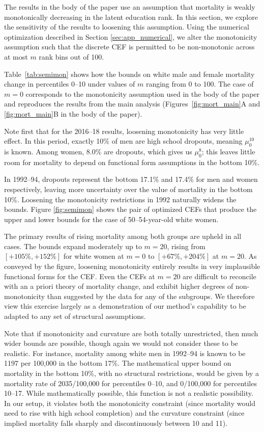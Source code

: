 The results in the body of the paper use an assumption that mortality is weakly monotonically decreasing in the latent education rank. In this section, we explore the sensitivity of the results to loosening this assumption. Using the numerical optimization described in Section \ref{sec:app_numerical}, we alter the monotonicity assumption such that the discrete CEF is permitted to be non-monotonic across at most $m$ rank bins out of 100.

Table~\ref{tab:semimon} shows how the bounds on white male and female mortality change in percentiles 0--10 under values of $m$ ranging from 0 to 100. The case of $m=0$ corresponds to the monotonicity assumption used in the body of the paper and reproduces the results from the main analysis (Figures~\ref{fig:mort_main}A and \ref{fig:mort_main}B in the body of the paper).

Note first that for the 2016--18 results, loosening monotonicity has very little effect. In this period, exactly 10\% of men are high school dropouts, meaning $\mu_0^{10}$ is known. Among women, 8.0\% are dropouts, which gives us $\mu_0^8$; this leaves little room for mortality to depend on functional form assumptions in the bottom 10\%.

In 1992--94, dropouts represent the bottom 17.1\% and 17.4\% for men and women respectively, leaving more uncertainty over the value of mortality in the bottom 10\%. Loosening the monotonicity restrictions in 1992 naturally widens the bounds. Figure \ref{fig:semimon} shows the pair of optimized CEFs that produce the upper and lower bounds for the case of 50--54-year-old white women.

The primary results of rising mortality among both groups are upheld in all cases. The bounds expand moderately up to $m=20$, rising from $[+105\%, +152\%]$ for white women at $m=0$ to $[+67\%, +204\%]$ at $m=20$. As conveyed by the figure, loosening monotonicity entirely results in very implausible functional forms for the CEF. Even the CEFs at $m=20$ are difficult to reconcile with an a priori theory of mortality change, and exhibit higher degrees of non-monotonicity than suggested by the data for any of the subgroups. We therefore view this exercise largely as a demonstration of our method's capability to be adapted to any set of structural assumptions.

Note that if monotonicity and curvature are both totally unrestricted, then much wider bounds are possible, though again we would not consider these to be realistic. For instance, mortality among white men in 1992--94 is known to be 1197 per 100,000 in the bottom 17\%. The mathematical upper bound on mortality in the bottom 10\%, with no structural restrictions, would be given by a mortality rate of 2035/100,000 for percentiles 0--10, and 0/100,000 for percentiles 10--17. While mathematically possible, this function is not a realistic possibility. In our setup, it violates both the monotonicity constraint (since mortality would need to rise with high school completion) and the curvature constraint (since implied mortality falls sharply and discontinuously between 10 and 11).

